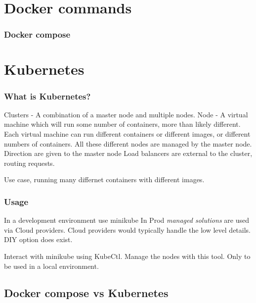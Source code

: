 \documentclass[a4paper, 11pt]{book}
\begin{document}
    \section{Docker commands}

    \subsubsection{Docker compose}


    \section{Kubernetes}

    \subsubsection{What is Kubernetes?}
    Clusters - A combination of a master node and multiple nodes.
    Node - A virtual machine which will run some number of containers, more than likely different.
    Each virtual machine can run different containers or different images, or different numbers of containers.
    All these different nodes are managed by the master node. Direction are given to the master node
    Load balancers are external to the cluster, routing requests.

    Use case, running many differnet containers with different images.

    \subsubsection{Usage}
    In a development environment use minikube
    In Prod \textit{managed solutions} are used via Cloud providers.
    Cloud providers would typically handle the low level details.
    DIY option does exist.

    Interact with minikube using KubeCtl.
    Manage the nodes with this tool.
    Only to be used in a local environment.

    \subsection{Docker compose vs Kubernetes}
\end{document}
